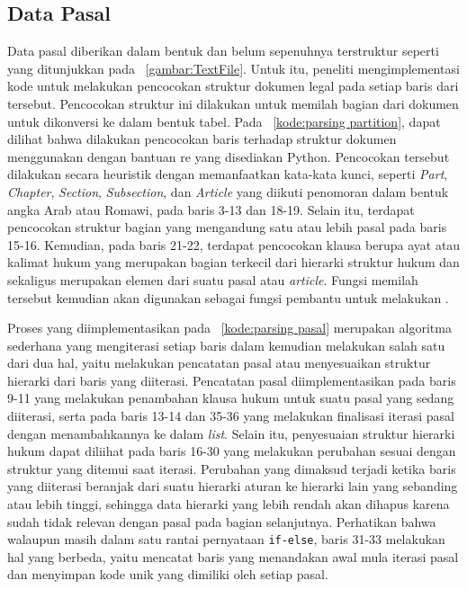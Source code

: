 \subsection{Data Pasal}
\label{subbab:4:Data Pasal}
Data pasal diberikan dalam bentuk \txt{} \file{} dan belum sepenuhnya terstruktur seperti yang ditunjukkan pada \gambar{}~\ref{gambar:TextFile}. Untuk itu, peneliti mengimplementasi kode untuk melakukan pencocokan struktur dokumen legal pada setiap baris dari \file{} tersebut. Pencocokan struktur ini dilakukan untuk memilah bagian dari dokumen untuk dikonversi ke dalam bentuk tabel. Pada \kode{}~\ref{kode:parsing partition}, dapat dilihat bahwa dilakukan pencocokan baris terhadap struktur dokumen menggunakan \regex{} dengan bantuan \library{} re yang disediakan Python. Pencocokan tersebut dilakukan secara heuristik dengan memanfaatkan kata-kata kunci, seperti \textit{Part}, \textit{Chapter}, \textit{Section}, \textit{Subsection}, dan \textit{Article} yang diikuti penomoran dalam bentuk angka Arab atau Romawi, pada baris 3-13 dan 18-19. Selain itu, terdapat pencocokan struktur bagian yang mengandung satu atau lebih pasal pada baris 15-16. Kemudian, pada baris 21-22, terdapat pencocokan klausa berupa ayat atau kalimat hukum yang merupakan bagian terkecil dari hierarki struktur hukum dan sekaligus merupakan elemen dari suatu pasal atau \textit{article}. Fungsi memilah tersebut kemudian akan digunakan sebagai fungsi pembantu untuk melakukan \parsing{}.


Proses \parsing{} yang diimplementasikan pada \kode{}~\ref{kode:parsing pasal} merupakan algoritma sederhana yang mengiterasi setiap baris dalam \file{} kemudian melakukan salah satu dari dua hal, yaitu melakukan pencatatan pasal atau menyesuaikan struktur hierarki dari baris yang diiterasi. Pencatatan pasal diimplementasikan pada baris 9-11 yang melakukan penambahan klausa hukum untuk suatu pasal yang sedang diiterasi, serta pada baris 13-14 dan 35-36 yang melakukan finalisasi iterasi pasal dengan menambahkannya ke dalam \textit{list}. Selain itu, penyesuaian struktur hierarki hukum dapat diliihat pada baris 16-30 yang melakukan perubahan sesuai dengan struktur yang ditemui saat iterasi. Perubahan yang dimaksud terjadi ketika baris yang diiterasi beranjak dari suatu hierarki aturan ke hierarki lain yang sebanding atau lebih tinggi, sehingga data hierarki yang lebih rendah akan dihapus karena sudah tidak relevan dengan pasal pada bagian selanjutnya. Perhatikan bahwa walaupun masih dalam satu rantai pernyataan \lstinline{if-else}, baris 31-33 melakukan hal yang berbeda, yaitu mencatat baris yang menandakan awal mula iterasi pasal dan menyimpan kode unik yang dimiliki oleh setiap pasal.


